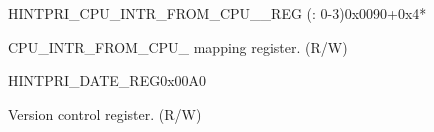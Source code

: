 \begin{register}{H}{INTPRI\_CPU\_INTR\_FROM\_CPU\_\_REG (: 0-3)}{0x0090+0x4*}\label{regdesc:INTPRICPUINTRFROMCPUNREG}
%
%
\regnewline%
\begin{regdesc}\begin{reglist}
\label{fielddesc:INTPRICPUINTRFROMCPUN}\item [INTPRI\_CPU\_INTR\_FROM\_CPU\_\regindex{n}] CPU\_INTR\_FROM\_CPU\_ mapping register. (R/W)
\end{reglist}\end{regdesc}
\end{register}


\begin{register}{H}{INTPRI\_DATE\_REG}{0x00A0}\label{regdesc:INTPRIDATEREG}
%
%
\regnewline%
\begin{regdesc}\begin{reglist}
\label{fielddesc:INTPRIDATE}\item [INTPRI\_DATE] Version control register. (R/W)
\end{reglist}\end{regdesc}
\end{register}
